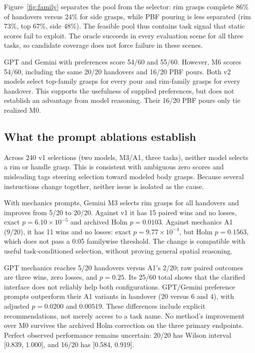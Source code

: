 \documentclass{article}
\begin{document}
Figure~\ref{fig:family} separates the pool from the selector: rim grasps complete 86\% of handovers versus 24\% for side grasps, while PBF pouring is less separated (rim 73\%, top 67\%, side 48\%). The feasible pool thus contains task signal that static scores fail to exploit. The oracle succeeds in every evaluation scene for all three tasks, so candidate coverage does not force failure in these scenes.

GPT and Gemini with preferences score 54/60 and 55/60. However, M6 scores 54/60, including the same 20/20 handovers and 16/20 PBF pours. Both v2 models select top-family grasps for every pour and rim-family grasps for every handover. This supports the usefulness of supplied preferences, but does not establish an advantage from model reasoning. Their 16/20 PBF pours only tie realized M0.

\subsection{What the prompt ablations establish}
Across 240 v1 selections (two models, M3/A1, three tasks), neither model selects a rim or handle grasp. This is consistent with ambiguous zero scores and misleading tags steering selection toward modeled body grasps. Because several instructions change together, neither issue is isolated as the cause.

With mechanics prompts, Gemini M3 selects rim grasps for all handovers and improves from 5/20 to 20/20. Against v1 it has 15 paired wins and no losses, exact $p=6.10\times10^{-5}$ and archived Holm $p=0.0103$. Against mechanics A1 (9/20), it has 11 wins and no losses: exact $p=9.77\times10^{-4}$, but Holm $p=0.1563$, which does not pass a 0.05 familywise threshold. The change is compatible with useful task-conditioned selection, without proving general spatial reasoning.

GPT mechanics reaches 5/20 handovers versus A1's 2/20; raw paired outcomes are three wins, zero losses, and $p=0.25$. Its 25/60 total shows that the clarified interface does not reliably help both configurations. GPT/Gemini preference prompts outperform their A1 variants in handover (20 versus 6 and 4), with adjusted $p=0.0200$ and $0.00519$. These differences include explicit recommendations, not merely access to a task name. No method's improvement over M0 survives the archived Holm correction on the three primary endpoints. Perfect observed performance remains uncertain: 20/20 has Wilson interval [0.839, 1.000], and 16/20 has [0.584, 0.919].
\end{document}

